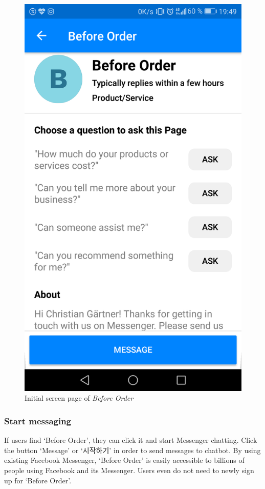 \begin{figure}[htbp]
\centerline{\includegraphics[height=\custompicheight]{./pictures/facebook_initial_page}}
\caption{Initial screen page of \emph{Before Order}}
\label{fig:Before Order_initial_screen}
\end{figure}
\FloatBarrier
\subsubsection{Start messaging}
 If users find ‘Before Order’, they can click it and start Messenger chatting. Click the button ‘Message’ or ‘시작하기’ in order to send messages to chatbot. By using existing Facebook Messenger, ‘Before Order’ is easily accessible to billions of people using Facebook and its Messenger. Users even do not need to newly sign up for ‘Before Order’.


